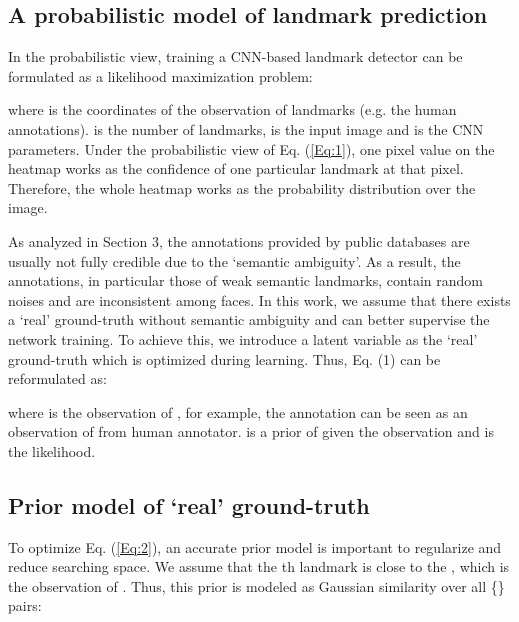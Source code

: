 \documentclass[10pt,twocolumn,letterpaper]{article}
\begin{document}
\subsection{A probabilistic model of landmark prediction}
In the probabilistic view, training a CNN-based  landmark detector can be formulated as a likelihood 
maximization problem:

where   is the coordinates of the observation of landmarks (e.g. the human annotations).
 is the number of landmarks, 
 is the input image and 
 is the CNN parameters. {Under the probabilistic view of Eq. (\ref{Eq:1}), one pixel value on the heatmap works as the confidence of one particular landmark at that pixel. Therefore, the whole heatmap works}
as the probability distribution over the image. 



{As analyzed in Section 3, the annotations provided by public databases are usually not fully credible due to the  `semantic ambiguity'.
As a result, the annotations, in particular those of weak semantic landmarks, contain random noises and are inconsistent among faces.
In this work, we assume that there exists a `real' ground-truth without semantic 
	ambiguity and can better supervise the network training. 
	To achieve this, we introduce a latent variable  as the `real' ground-truth which is optimized 
	during learning.}
{Thus, Eq. (1)  can be reformulated as:}



{where   is  the observation of , for example, the annotation can be seen 
	as an observation of  from human annotator. 
	 is a prior of  given the observation 
	and  is the likelihood. 
}



\subsection{{Prior model of `real' ground-truth}}
{To optimize Eq. (\ref{Eq:2}), an accurate prior model is important to regularize  and reduce searching space. We assume that the th landmark 
	 is close to the , {which is the observation of }. Thus, this prior  is modeled as Gaussian similarity over all   \{\} pairs:}
\end{document}
